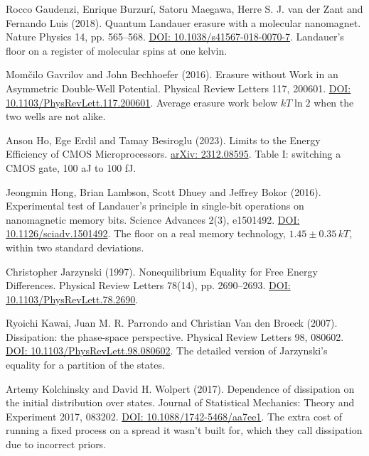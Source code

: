 \documentclass[11pt,twoside]{article}
\theoremstyle{thielethm}
\theoremstyle{thieledef}
\theoremstyle{thieledef}
\theoremstyle{thieledef}
\theoremstyle{thielethm}
\theoremstyle{thieleobs}
\theoremstyle{thielethm}
\begin{document}
\noindent Rocco Gaudenzi, Enrique Burzur\'i, Satoru Maegawa, Herre S. J. van der Zant and Fernando Luis (2018). Quantum Landauer erasure with a molecular nanomagnet. Nature Physics 14, pp. 565--568. \href{https://doi.org/10.1038/s41567-018-0070-7}{DOI: 10.1038/s41567-018-0070-7}. Landauer's floor on a register of molecular spins at one kelvin.
\par\medskip

\noindent Mom\v{c}ilo Gavrilov and John Bechhoefer (2016). Erasure without Work in an Asymmetric Double-Well Potential. Physical Review Letters 117, 200601. \href{https://doi.org/10.1103/PhysRevLett.117.200601}{DOI: 10.1103/PhysRevLett.117.200601}. Average erasure work below $kT\ln 2$ when the two wells are not alike.
\par\medskip

\noindent Anson Ho, Ege Erdil and Tamay Besiroglu (2023). Limits to the Energy Efficiency of CMOS Microprocessors. \href{https://arxiv.org/abs/2312.08595}{arXiv: 2312.08595}. Table I: switching a CMOS gate, 100 aJ to 100 fJ.
\par\medskip

\noindent Jeongmin Hong, Brian Lambson, Scott Dhuey and Jeffrey Bokor (2016). Experimental test of Landauer's principle in single-bit operations on nanomagnetic memory bits. Science Advances 2(3), e1501492. \href{https://doi.org/10.1126/sciadv.1501492}{DOI: 10.1126/sciadv.1501492}. The floor on a real memory technology, $1.45 \pm 0.35\,kT$, within two standard deviations.
\par\medskip

\noindent Christopher Jarzynski (1997). Nonequilibrium Equality for Free Energy Differences. Physical Review Letters 78(14), pp. 2690--2693. \href{https://doi.org/10.1103/PhysRevLett.78.2690}{DOI: 10.1103/PhysRevLett.78.2690}.
\par\medskip

\noindent Ryoichi Kawai, Juan M. R. Parrondo and Christian Van den Broeck (2007). Dissipation: the phase-space perspective. Physical Review Letters 98, 080602. \href{https://doi.org/10.1103/PhysRevLett.98.080602}{DOI: 10.1103/PhysRevLett.98.080602}. The detailed version of Jarzynski's equality for a partition of the states.
\par\medskip

\noindent Artemy Kolchinsky and David H. Wolpert (2017). Dependence of dissipation on the initial distribution over states. Journal of Statistical Mechanics: Theory and Experiment 2017, 083202. \href{https://doi.org/10.1088/1742-5468/aa7ee1}{DOI: 10.1088/1742-5468/aa7ee1}. The extra cost of running a fixed process on a spread it wasn't built for, which they call dissipation due to incorrect priors.
\par\medskip
\end{document}
